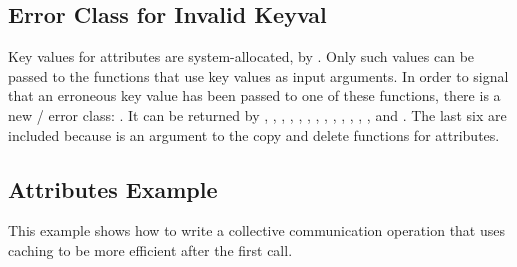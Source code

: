 \subsection{Error Class for Invalid Keyval}

\label{subsec:ei-attr:invalidkeyval}

Key values for attributes are system-allocated, by
%
%
%
. Only such values can be passed to the
functions that use key values as input arguments. In order to signal that
an erroneous key value has been passed to one of these functions,
there is a new \MPI/ error class: . It can be
returned by , ,
, ,
%
%
%
%
%
%
%
%
%
%
%
%
,
,
,
,
, ,
, ,
, and . The
last six are included
because  is an argument to the copy and delete functions for
attributes.

\subsection{Attributes Example}
\label{ex:comm-attributes}
\begin{users}
This example shows how to write a collective communication operation
that uses caching to be more efficient after the first call.
\end{users}

